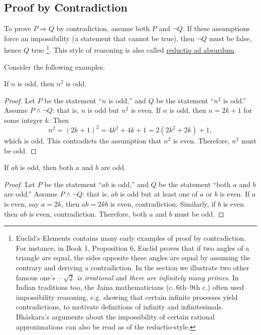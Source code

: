 \subsection{Proof by Contradiction}
To prove \(P \Rightarrow Q\) by contradiction, assume both \(P\) and \(\neg Q\). If these assumptions force an impossibility (a statement that cannot be true), then \(\neg Q\) must be false, hence \(Q\) true \footnote{Euclid’s Elements contains many early examples of proof by contradiction. For instance, in Book 1, Proposition 6, Euclid proves that if two angles of a triangle are equal, the sides opposite these angles are equal by assuming the contrary and deriving a contradiction. In the section we illustrate two other famous one's -- {\em $\sqrt{2}$ is irrational} and {\em there are infinitely many primes}. In Indian traditions too, the Jaina mathematicians (c. 6th–9th c.) often used impossibility reasoning, e.g. showing that certain infinite processes yield contradictions, to motivate definitions of infinity and infinitesimals.  Bh\'{a}skara’s arguments about the impossibility of certain rational approximations can also be read as of the reductio-style.  }. This style of reasoning is also called \href{https://en.wikipedia.org/wiki/Reductio\_ad\_absurdum}{reductio ad absurdum}.

Consider the following examples.

\begin{theorem}
If $n$ is odd, then $n^2$ is odd.
\end{theorem}

\begin{proof}
Let $P$ be the statement ``$n$ is odd,'' and $Q$ be the statement ``$n^2$ is odd.''  
Assume $P \land \neg Q$: that is, $n$ is odd but $n^2$ is even.  
If $n$ is odd, then $n = 2k+1$ for some integer $k$. Then
\[
n^2 = (2k+1)^2 = 4k^2 + 4k + 1 = 2(2k^2+2k) + 1,
\]
which is odd. This contradicts the assumption that $n^2$ is even.  
Therefore, $n^2$ must be odd.
\end{proof}

\begin{theorem}
If $ab$ is odd, then both $a$ and $b$ are odd.
\end{theorem}

\begin{proof}
Let $P$ be the statement ``$ab$ is odd,'' and $Q$ be the statement ``both $a$ and $b$ are odd.''  
Assume $P \land \neg Q$: that is, $ab$ is odd but at least one of $a$ or $b$ is even.  
If $a$ is even, say $a=2k$, then $ab=2kb$ is even, contradiction.  
Similarly, if $b$ is even then $ab$ is even, contradiction.  
Therefore, both $a$ and $b$ must be odd.
\end{proof}

